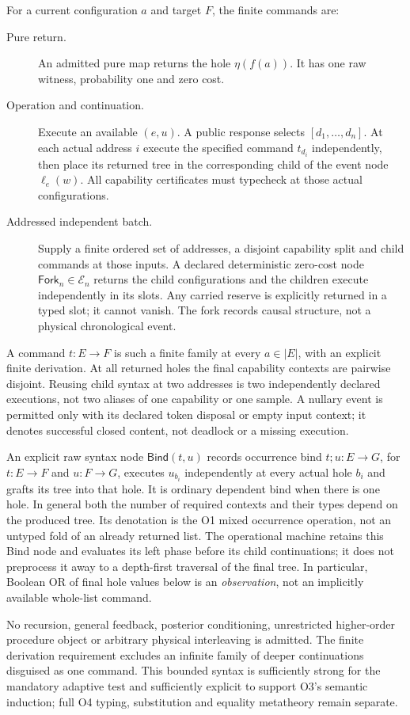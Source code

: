 \documentclass[11pt,a4paper]{article}
\theoremstyle{definition}
\begin{document}
For a current configuration $a$ and target $F$, the finite commands are:
\begin{description}
\item[Pure return.] An admitted pure map returns the hole $\eta(f(a))$.
It has one raw witness, probability one and zero cost.
\item[Operation and continuation.] Execute an available $(e,u)$. A public
response selects $[d_1,\ldots,d_n]$. At each actual address $i$ execute the
specified command $t_{d_i}$ independently, then place its returned tree in
the corresponding child of the event node $\ell_e(w)$. All capability
certificates must typecheck at those actual configurations.
\item[Addressed independent batch.] Supply a finite ordered set of addresses,
a disjoint capability split and child commands at those inputs. A declared
deterministic zero-cost node $\mathsf{Fork}_n\in\mathcal E_n$ returns the
child configurations and the children execute independently in its slots.
Any carried reserve is explicitly returned in a typed slot; it cannot vanish.
The fork records causal structure, not a physical chronological event.
\end{description}
A command $t:E\to F$ is such a finite family at every $a\in|E|$, with an
explicit finite derivation. At all returned holes the final capability
contexts are pairwise disjoint. Reusing child syntax at two addresses is
two independently declared executions, not two aliases of one capability
or one sample. A nullary event is permitted only with its declared token
disposal or empty input context; it denotes successful closed content,
not deadlock or a missing execution.

An explicit raw syntax node $\mathsf{Bind}(t,u)$ records occurrence bind
$t;u:E\to G$, for $t:E\to F$ and $u:F\to G$, executes
$u_{b_i}$ independently at every actual hole $b_i$ and grafts its tree into
that hole. It is ordinary dependent bind when there is one hole. In general
both the number of required contexts and their types depend on the produced
tree. Its denotation is the O1 mixed occurrence operation, not an untyped fold
of an already returned list. The operational machine retains this Bind
node and evaluates its left phase before its child continuations; it does
not preprocess it away to a depth-first traversal of the final tree. In particular, Boolean OR of final hole values below
is an \emph{observation}, not an implicitly available whole-list command.

No recursion, general feedback, posterior conditioning, unrestricted
higher-order procedure object or arbitrary physical interleaving is admitted.
The finite derivation requirement excludes an infinite family of deeper
continuations disguised as one command. This bounded syntax is sufficiently
strong for the mandatory adaptive test and sufficiently explicit to support
O3's semantic induction; full O4 typing, substitution and equality metatheory
remain separate.
\end{document}
